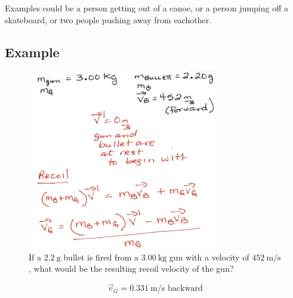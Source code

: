\documentclass[a4paper,12pt]{article}
\begin{document}
Examples could be a person getting out of a canoe, or a person jumping off a skateboard, or two people pushing away from eachother.

\subsection{Example}
\begin{figure}[H]
    \centering
    \caption{If a $\SI{2.2}{\g}$ bullet is fired from a $\SI{3.00}{\kg}$ gun with a velocity of $\SI{452}{\m/\s}$, what would be the resulting recoil velocity of the gun?}
    \includegraphics[width=0.75\textwidth]{q-recoil-1}
\end{figure}
$$\vec{v}_G = \SI{0.331}{\m/\s}\textrm{ backward}$$
\end{document}
